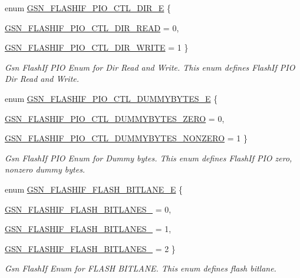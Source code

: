 \begin{DoxyCompactItemize}
\item 
enum \hyperlink{a00647_gaaf02993c8f105b4a90a6b27ef19dae0f}{GSN\_\-FLASHIF\_\-PIO\_\-CTL\_\-DIR\_\-E} \{ \par
\hyperlink{a00647_ggaaf02993c8f105b4a90a6b27ef19dae0fafe8b742258651fa64d0b4c4012346bda}{GSN\_\-FLASHIF\_\-PIO\_\-CTL\_\-DIR\_\-READ} =  0, 
\par
\hyperlink{a00647_ggaaf02993c8f105b4a90a6b27ef19dae0faf5c50092b2e7d13c595cf3c2e0723aaa}{GSN\_\-FLASHIF\_\-PIO\_\-CTL\_\-DIR\_\-WRITE} =  1
 \}
\begin{DoxyCompactList}\small\item\em Gsn FlashIf PIO Enum for Dir Read and Write. This enum defines FlashIf PIO Dir Read and Write. \end{DoxyCompactList}\item 
enum \hyperlink{a00647_ga21630134ac87b1ff38712e4f4c0b4a4e}{GSN\_\-FLASHIF\_\-PIO\_\-CTL\_\-DUMMYBYTES\_\-E} \{ \par
\hyperlink{a00647_gga21630134ac87b1ff38712e4f4c0b4a4eaecca8709c0b664eeabca124be5cb94e2}{GSN\_\-FLASHIF\_\-PIO\_\-CTL\_\-DUMMYBYTES\_\-ZERO} =  0, 
\par
\hyperlink{a00647_gga21630134ac87b1ff38712e4f4c0b4a4ea9994e4e9597b9fbf54d26239248e08c2}{GSN\_\-FLASHIF\_\-PIO\_\-CTL\_\-DUMMYBYTES\_\-NONZERO} =  1
 \}
\begin{DoxyCompactList}\small\item\em Gsn FlashIf PIO Enum for Dummy bytes. This enum defines FlashIf PIO zero, nonzero dummy bytes. \end{DoxyCompactList}\item 
enum \hyperlink{a00647_gad00f759b28a1db7a281e681f949cd164}{GSN\_\-FLASHIF\_\-FLASH\_\-BITLANE\_\-E} \{ \par
\hyperlink{a00647_ggad00f759b28a1db7a281e681f949cd164a82324c677576b831a7a6306b1ea3466d}{GSN\_\-FLASHIF\_\-FLASH\_\-BITLANES\_} =  0, 
\par
\hyperlink{a00647_ggad00f759b28a1db7a281e681f949cd164ad2aecd6be0e0851d10f33a12223b4cd7}{GSN\_\-FLASHIF\_\-FLASH\_\-BITLANES\_} =  1, 
\par
\hyperlink{a00647_ggad00f759b28a1db7a281e681f949cd164a7e743bb40684d8ff42f8503216dcc6c6}{GSN\_\-FLASHIF\_\-FLASH\_\-BITLANES\_} =  2
 \}
\begin{DoxyCompactList}\small\item\em Gsn FlashIf Enum for FLASH BITLANE. This enum defines flash bitlane. \end{DoxyCompactList}\end{DoxyCompactItemize}
